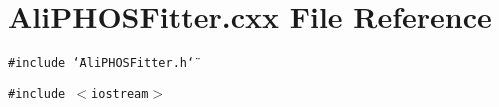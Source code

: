 \section{Ali\-PHOSFitter.cxx File Reference}
\label{AliPHOSFitter_8cxx}
{\tt \#include \char`\"{}Ali\-PHOSFitter.h\char`\"{}}\par
{\tt \#include $<$iostream$>$}\par
